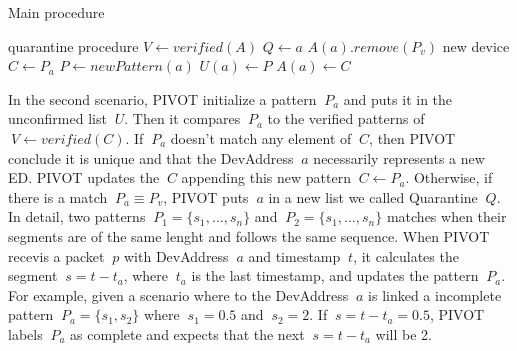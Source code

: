 \begin{algorithm}
    \caption{Main procedure}
    \begin{algorithmic}[1]
                    \State quarantine procedure
                \EndIf
                \State $V \gets verified(A)$
                        \State $Q \gets a$
                    \Else
                        \State $A(a).remove(P_{v})$
                    \EndIf
                \EndFor
                    \State new device
                    \State $C \gets P_{a}$
                \EndIf
            \Else
                \State $P \gets newPattern(a)$
                \State $U(a) \gets P$
                \State $A(a) \gets C$
            \EndIf
        \EndIf
    \end{algorithmic}
\end{algorithm}

In the second scenario, PIVOT initialize a pattern \(\ P_{a} \) and puts it in the unconfirmed list \(\ U \). Then it compares \(\ P_{a} \) to the verified patterns of \(\ V \gets verified(C) \). If \(\ P_{a} \) doesn't match any element of \(\ C \), then PIVOT conclude it is unique and that the DevAddress \(\ a \) necessarily represents a new ED. PIVOT updates the \(\ C \) appending this new pattern \(\ C \gets P_{a} \). Otherwise, if there is a match \(\ P_{a} \equiv P_{v}\), PIVOT puts \(\ a \) in a new list we called Quarantine \(\ Q\). In detail, two patterns \(\ P_{1} = \{ s_{1}, ..., s_{n} \}\) and \(\ P_{2} = \{ s_{1}, ..., s_{n} \}\) matches when their segments are of the same lenght and follows the same sequence.
When PIVOT recevis a packet \(\ p \) with DevAddress \(\ a \) and timestamp \(\ t \), it calculates the segment \(\ s = t - t_{a} \), where \(\ t_{a} \) is the last timestamp, and updates the pattern \(\ P_{a} \). For example, given a scenario where to the DevAddress \(\ a \) is linked a incomplete pattern \(\ P_{a} = \{ s_{1}, s_{2} \}\) where \(\ s_{1} = 0.5 \) and \(\ s_{2} = 2 \). If \(\ s = t - t_{a} = 0.5 \), PIVOT labels \(\ P_{a} \) as complete and expects that the next \(\ s = t - t_{a} \) will be 2.

